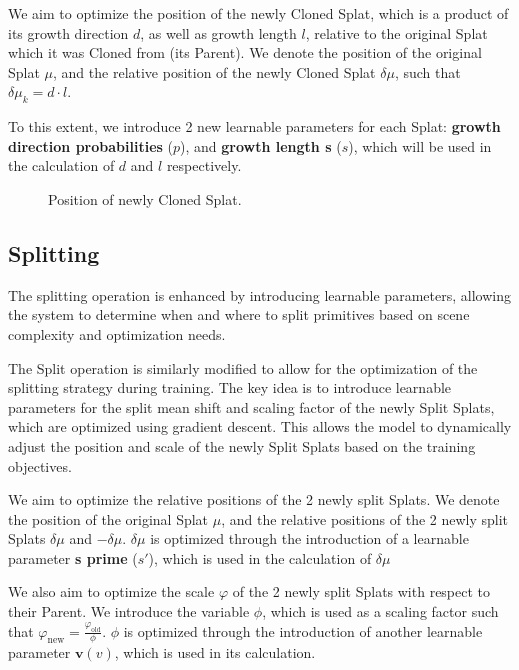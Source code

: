 \documentclass[11pt]{report}
\begin{document}
We aim to optimize the position of the newly Cloned Splat, which is a product of its growth direction $d$, as well as growth length $l$, relative to the original Splat which it was Cloned from (its Parent). We denote the position of the original Splat $\mu$, and the relative position of the newly Cloned Splat $\delta \mu$, such that $\delta \mu_k = d\cdot l$.

To this extent, we introduce 2 new learnable parameters for each Splat: \textbf{growth direction probabilities} ($p$), and \textbf{growth length s} ($s$), which will be used in the calculation of $d$ and $l$ respectively.

\begin{figure}[H]
    \centering
    
    \caption{Position of newly Cloned Splat.}
    \label{fig:clone}
\end{figure}

\subsection{Splitting}
The splitting operation is enhanced by introducing learnable parameters, allowing the system to determine when and where to split primitives based on scene complexity and optimization needs. 



The Split operation is similarly modified to allow for the optimization of the splitting strategy during training. The key idea is to introduce learnable parameters for the split mean shift and scaling factor of the newly Split Splats, which are optimized using gradient descent. This allows the model to dynamically adjust the position and scale of the newly Split Splats based on the training objectives. 

We aim to optimize the relative positions of the 2 newly split Splats. We denote the position of the original Splat $\mu$, and the relative positions of the 2 newly split Splats $\delta \mu$ and $- \delta \mu$. $\delta \mu$ is optimized through the introduction of a learnable parameter \textbf{s prime} ($s'$), which is used in the calculation of $\delta \mu$

We also aim to optimize the scale $\varphi$ of the 2 newly split Splats with respect to their Parent. We introduce the variable $\phi$, which is used as a scaling factor such that $\varphi_{\text{new}} = \frac{\varphi_{\text{old}}}{\phi}$. $\phi$ is optimized through the introduction of another learnable parameter $\mathbf{v}(v)$, which is used in its calculation.
\end{document}
